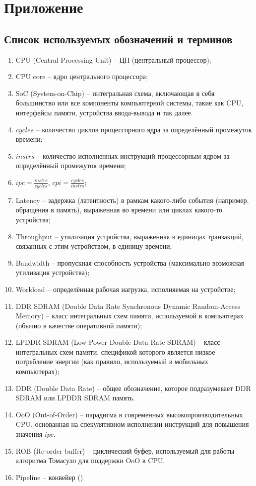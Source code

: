 \section*{Приложение}
\label{sec:Apendix} 

\subsection*{Список используемых обозначений и терминов}

\begin{enumerate}
    \item CPU (Central Processing Unit) -- ЦП (центральный процессор);
    \item CPU core -- ядро центрального процессора;
    \item SoC (System-on-Chip) -- интегральная схема, включающая в себя большинство или все
        компоненты компьютерной системы, такие как CPU, интерфейсы памяти, устройства ввода-вывода
        и так далее.
    \item $cycles$ -- количество циклов процессорного ядра за определённый промежуток времени;
    \item $instrs$ -- количество исполненных инструкций процессорным ядром за определённый
        промежуток времени;
    \item $ipc = \frac{instrs}{cycles}$, $cpi = \frac{cycles}{instrs}$;
    \item Latency -- задержка (латентность) в рамкам какого-либо события (например,
        обращения в память), выраженная во времени или циклах какого-то устройства;
    \item Throughput -- утилизация устройства, выраженная в единицах транзакций, связанных с
        этим устройством, в единицу времени;
    \item Bandwidth -- пропускная способность устройства (максимально возможная утилизация
        устройства);
    \item Workload -- определённая рабочая нагрузка, исполняемая на устройстве;
    \item DDR SDRAM (Double Data Rate Synchronous Dynamic Random-Access Memory) -- класс
        интегральных схем памяти, используемой в компьютерах (обычно в качестве оперативной
        памяти);
    \item LPDDR SDRAM (Low-Power Double Data Rate SDRAM) -- класс интегральных
        схем памяти, спецификой которого является низкое потребление энергии (как правило,
        используемый в мобильных компьютерах);
    \item DDR (Double Data Rate) -- общее обозначение, которое подразумевает DDR SDRAM или
        LPDDR SDRAM память.
    \item OoO (Out-of-Order) -- парадигма в современных высокопроизводительных CPU, основанная
        на спекулятивном исполнении инструкций для повышения значения $ipc$.
    \item ROB (Re-order buffer) -- циклический буфер, используемый для работы алгоритма Томасуло
        для поддержки OoO в CPU.
    \item Pipeline -- конвейер ()

\end{enumerate}
